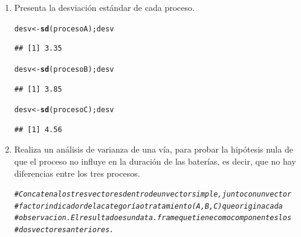 \documentclass[12pt,letterpaper]{article}\usepackage[]{graphicx}\usepackage[]{color}
\makeatletter
\newcommand{\hlcom}[1]{\textcolor[rgb]{0.678,0.584,0.686}{\textit{#1}}}%
\newcommand{\hlstd}[1]{\textcolor[rgb]{0.345,0.345,0.345}{#1}}%
\newcommand{\hlkwb}[1]{\textcolor[rgb]{0.69,0.353,0.396}{#1}}%
\newcommand{\hlkwd}[1]{\textcolor[rgb]{0.737,0.353,0.396}{\textbf{#1}}}%
\newenvironment{kframe}{%
 \def\at@end@of@kframe{}%
 \ifinner\ifhmode%
  \def\at@end@of@kframe{\end{minipage}}%
  \begin{minipage}{\columnwidth}%
 \fi\fi%
 \def\FrameCommand##1{\hskip\@totalleftmargin \hskip-\fboxsep
 \colorbox{shadecolor}{##1}\hskip-\fboxsep
     \hskip-\linewidth \hskip-\@totalleftmargin \hskip\columnwidth}%
 \MakeFramed {\advance\hsize-\width
   \@totalleftmargin\z@ \linewidth\hsize
   \@setminipage}}%
 {\par\unskip\endMakeFramed%
 \at@end@of@kframe}
\newenvironment{knitrout}{}{} %
\makeatother
\begin{document}
\begin{enumerate}
\item Presenta la desviaci\'on est\'andar de cada proceso. 

\begin{knitrout}
\color{fgcolor}\begin{kframe}
\begin{alltt}
 \hlstd{desv} \hlkwb{<-} \hlkwd{sd}\hlstd{(procesoA); desv}
\end{alltt}
\begin{verbatim}
## [1] 3.35
\end{verbatim}
\begin{alltt}
 \hlstd{desv} \hlkwb{<-} \hlkwd{sd}\hlstd{(procesoB); desv}
\end{alltt}
\begin{verbatim}
## [1] 3.85
\end{verbatim}
\begin{alltt}
 \hlstd{desv} \hlkwb{<-} \hlkwd{sd}\hlstd{(procesoC); desv}
\end{alltt}
\begin{verbatim}
## [1] 4.56
\end{verbatim}
\end{kframe}
\end{knitrout}

\item Realiza un an\'alisis de varianza de una v\'ia, para probar la hip\'otesis nula de que el proceso no influye en la duraci\'on de las bater\'ias, es decir, que no hay diferencias entre los tres procesos.

\begin{knitrout}
\color{fgcolor}\begin{kframe}
\begin{alltt}
\hlcom{# Concatena los tres vectores dentro de un vector simple, junto con un vector }
\hlcom{# factor indicador de la categoría o tratamiento (A, B, C) que origina cada}
\hlcom{# observacion. El resultado es un data.frame que tiene como componentes los }
\hlcom{# dos vectores anteriores. }
\end{alltt}
\end{kframe}
\end{knitrout}


\end{enumerate}
\end{document}
